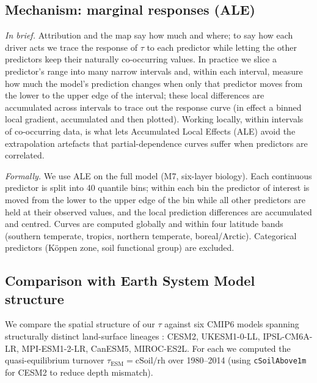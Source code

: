 \documentclass[12pt, a4paper]{article}
\begin{document}
\subsection{Mechanism: marginal responses (ALE)}
\label{sec:ale}
\textit{In brief.} Attribution and the map say how much and where; to say how
each driver acts we trace the response of $\tau$ to each predictor while letting the
other predictors keep their naturally co-occurring values. In practice we slice a
predictor's range into many narrow intervals and, within each interval, measure how
much the model's prediction changes when only that predictor moves from the lower
to the upper edge of the interval; these local differences are accumulated across
intervals to trace out the response curve (in effect a binned local gradient,
accumulated and then plotted). Working locally, within intervals of co-occurring
data, is what lets Accumulated Local Effects (ALE) avoid the extrapolation
artefacts that partial-dependence curves suffer when predictors are correlated.

\textit{Formally.} We use ALE \citep{Apley2020} on the full model (M7, six-layer biology). Each continuous predictor is split
into 40 quantile bins; within each bin the predictor of interest is moved from the
lower to the upper edge of the bin while all other predictors are held at their
observed values, and the local prediction differences are accumulated and centred. Curves are computed globally and within four latitude
bands (southern temperate, tropics, northern temperate, boreal/Arctic).
Categorical predictors (K\"oppen zone, soil functional group) are excluded.

\subsection{Comparison with Earth System Model structure}
\label{sec:esm}
We compare the spatial structure of our $\tau$ against six CMIP6 models spanning
structurally distinct land-surface lineages \citep{Varney2022}: CESM2, UKESM1-0-LL,
IPSL-CM6A-LR, MPI-ESM1-2-LR, CanESM5, MIROC-ES2L. For each we computed the
quasi-equilibrium turnover $\tau_\text{ESM}=\text{cSoil}/\text{rh}$
\citep{Koven2017,Carvalhais2014} over 1980--2014 (using \texttt{cSoilAbove1m} for
CESM2 to reduce depth mismatch).
\end{document}
